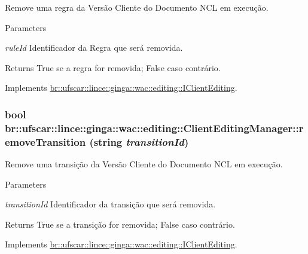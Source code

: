 Remove uma regra da Versão Cliente do Documento NCL em execução. 


\begin{DoxyParams}{Parameters}
\item[{\em ruleId}]Identificador da Regra que será removida. \end{DoxyParams}
\begin{DoxyReturn}{Returns}
True se a regra for removida; False caso contrário. 
\end{DoxyReturn}


Implements \hyperlink{classbr_1_1ufscar_1_1lince_1_1ginga_1_1wac_1_1editing_1_1IClientEditing_a1b9bb86e478437909dd6f5a77f2ff4b4}{br::ufscar::lince::ginga::wac::editing::IClientEditing}.

\hypertarget{classbr_1_1ufscar_1_1lince_1_1ginga_1_1wac_1_1editing_1_1ClientEditingManager_a6aebcca439720cc2c9b69d6b7b5c45c7}{
\subsubsection[{removeTransition}]{\setlength{\rightskip}{0pt plus 5cm}bool br::ufscar::lince::ginga::wac::editing::ClientEditingManager::removeTransition (string {\em transitionId})}}
\label{classbr_1_1ufscar_1_1lince_1_1ginga_1_1wac_1_1editing_1_1ClientEditingManager_a6aebcca439720cc2c9b69d6b7b5c45c7}


Remove uma transição da Versão Cliente do Documento NCL em execução. 


\begin{DoxyParams}{Parameters}
\item[{\em transitionId}]Identificador da transição que será removida. \end{DoxyParams}
\begin{DoxyReturn}{Returns}
True se a transição for removida; False caso contrário. 
\end{DoxyReturn}


Implements \hyperlink{classbr_1_1ufscar_1_1lince_1_1ginga_1_1wac_1_1editing_1_1IClientEditing_a4f88db31bb7d754489e7cc965d9035c2}{br::ufscar::lince::ginga::wac::editing::IClientEditing}.


